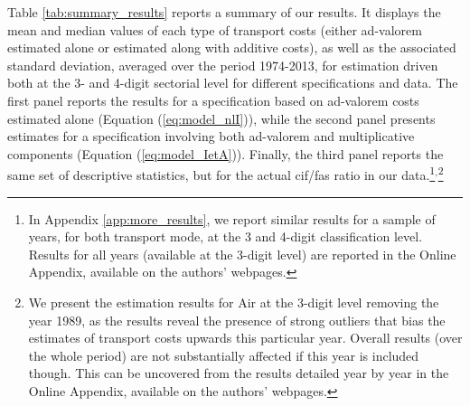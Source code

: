 \documentclass[a4paper,11pt]{article}
\begin{document}
Table \ref{tab:summary_results} reports a summary of our results. It displays the mean and median values of each type of transport costs (either ad-valorem estimated alone or estimated along with additive costs), as well as the associated standard deviation, averaged over the period 1974-2013, for estimation driven both at the 3- and 4-digit sectorial level for different specifications and data. The first panel reports the results for a specification based on ad-valorem costs estimated alone (Equation (\ref{eq:model_nlI})), while the second panel presents estimates for a specification involving both ad-valorem and multiplicative components (Equation (\ref{eq:model_IetA})). Finally, the third panel reports the same set of descriptive statistics, but for the actual cif/fas ratio in our data.\footnote{In Appendix \ref{app:more_results}, we report similar results for a sample of years, for both transport mode, at the 3 and 4-digit classification level. Results for all years (available at the 3-digit level) are reported in the Online Appendix, available on the authors' webpages.}$^{,}$\footnote{We present the estimation results for Air at the 3-digit level removing the year 1989, as the results reveal the presence of strong outliers that bias the estimates of transport costs upwards this particular year. Overall results (over the whole period) are not substantially affected if this year is included though. This can be uncovered from the results detailed year by year in the Online Appendix, available on the authors' webpages.}
\end{document}
